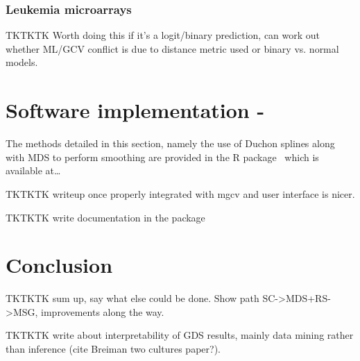 \subsubsection{Leukemia microarrays}

TKTKTK Worth doing this if it's a logit/binary prediction, can work out whether ML/GCV conflict is due to distance metric used or binary vs. normal models.

\section{Software implementation - \mdspack}
\label{gds-software}

The methods detailed in this section, namely the use of Duchon splines along with MDS to perform smoothing are provided in the \textsf{R} package \mdspack\ which is available at\ldots

TKTKTK writeup once properly integrated with mgcv and user interface is nicer.

TKTKTK write documentation in the package


\section{Conclusion}
\label{gds-conclusion}

TKTKTK sum up, say what else could be done. Show path SC->MDS+RS->MSG, improvements along the way.

TKTKTK write about interpretability of GDS results, mainly data mining rather than inference (cite Breiman two cultures paper?).

